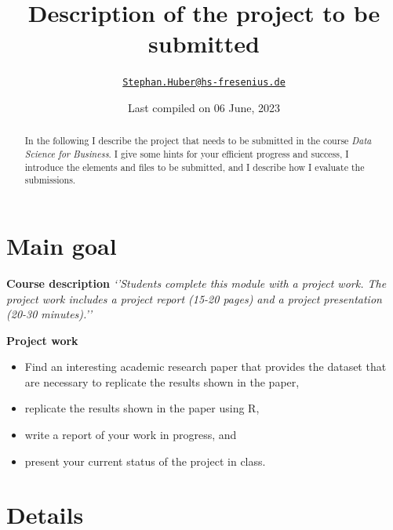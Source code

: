 \documentclass[
  12pt,
]{article}
\title{Description of the project to be submitted}
\author{\href{mailto:Stephan.Huber@hs-fresenius.de}{\nolinkurl{Stephan.Huber@hs-fresenius.de}}}
\date{Last compiled on 06 June, 2023}
\providecommand{\tightlist}{%
  \setlength{\itemsep}{0pt}\setlength{\parskip}{0pt}}
\begin{document}
\maketitle
\begin{abstract}
In the following I describe the project that needs to be submitted in the course \emph{Data Science for Business}. I give some hints for your efficient progress and success, I introduce the elements and files to be submitted, and I describe how I evaluate the submissions.
\end{abstract}

{
\hypersetup{linkcolor=}
\setcounter{tocdepth}{3}
\tableofcontents
}
\hypertarget{main-goal}{%
\section{Main goal}\label{main-goal}}

\textbf{Course description}
\emph{`'Students complete this module with a project work. The project work includes a project report (15-20 pages) and a project presentation (20-30 minutes).''}

\textbf{Project work}

\begin{itemize}
\tightlist
\item
  Find an interesting academic research paper that provides the dataset that are necessary to replicate the results shown in the paper,
\item
  replicate the results shown in the paper using R,
\item
  write a report of your work in progress, and
\item
  present your current status of the project in class.
\end{itemize}

\hypertarget{details}{%
\section{Details}\label{details}}
\end{document}
